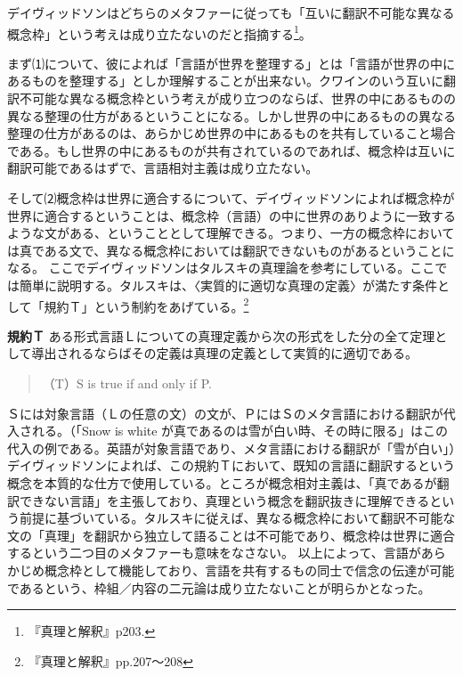 \documentclass[b5j,twoside,twocolumn]{utarticle}
\begin{document}
デイヴィッドソンはどちらのメタファーに従っても「互いに翻訳不可能な異なる概念枠」という考えは成り立たないのだと指摘する\footnote{『真理と解釈』p203.}。


まず⑴について、彼によれば「言語が世界を整理する」とは「言語が世界の中にあるものを整理する」としか理解することが出来ない。クワインのいう互いに翻訳不可能な異なる概念枠という考えが成り立つのならば、世界の中にあるものの異なる整理の仕方があるということになる。しかし世界の中にあるものの異なる整理の仕方があるのは、あらかじめ世界の中にあるものを共有していること場合である。もし世界の中にあるものが共有されているのであれば、概念枠は互いに翻訳可能であるはずで、言語相対主義は成り立たない。


そして⑵概念枠は世界に適合するについて、デイヴィッドソンによれば概念枠が世界に適合するということは、概念枠（言語）の中に世界のありように一致するような文がある、ということとして理解できる。つまり、一方の概念枠においては真である文で、異なる概念枠においては翻訳できないものがあるということになる。
ここでデイヴィッドソンはタルスキの真理論を参考にしている。ここでは簡単に説明する。タルスキは、〈実質的に適切な真理の定義〉が満たす条件として「規約Ｔ」という制約をあげている。\footnote{『真理と解釈』pp.207〜208}
\begin{itembox}[l]{\textbf{規約Ｔ}}
ある形式言語Ｌについての真理定義から次の形式をした分の全て定理として導出されるならばその定義は真理の定義として実質的に適切である。
\begin{quote}
（T）S is true if and only if P.
\end{quote}
\end{itembox}


Ｓには対象言語（Ｌの任意の文）の文が、ＰにはＳのメタ言語における翻訳が代入される。（「Snow is white が真であるのは雪が白い時、その時に限る」はこの代入の例である。英語が対象言語であり、メタ言語における翻訳が「雪が白い」）デイヴィッドソンによれば、この規約Ｔにおいて、既知の言語に翻訳するという概念を本質的な仕方で使用している。ところが概念相対主義は、「真であるが翻訳できない言語」を主張しており、真理という概念を翻訳抜きに理解できるという前提に基づいている。タルスキに従えば、異なる概念枠において翻訳不可能な文の「真理」を翻訳から独立して語ることは不可能であり、概念枠は世界に適合するという二つ目のメタファーも意味をなさない。
以上によって、言語があらかじめ概念枠として機能しており、言語を共有するもの同士で信念の伝達が可能であるという、枠組／内容の二元論は成り立たないことが明らかとなった。
\end{document}
